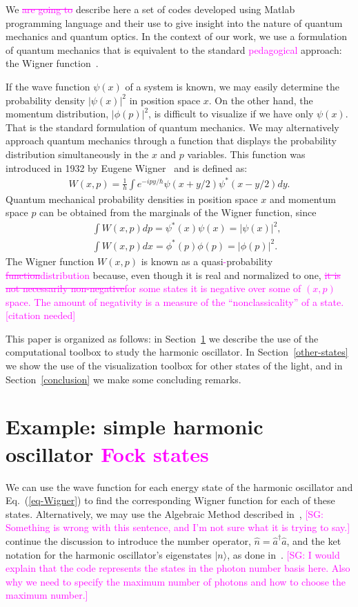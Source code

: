 \documentclass[twocolumn]{rbef}
\providecommand{\aucmnt}[1]{#1}
\providecommand{\editcolor}[2]{\textcolor{#1}{#2}}
\providecommand{\aucmnt}[1]{}
\providecommand{\editcolor}[2]{#2}
\newcommand{\SG}[1]{\editcolor{magenta}{#1}}
\newcommand{\SGs}[1]{\aucmnt{\editcolor{magenta}{\sout{#1}}}}
\newcommand{\SGc}[1]{\aucmnt{\editcolor{magenta}{[SG: #1]}}}
\begin{document}
We \SGs{are going to} describe here a set of codes developed using
Matlab programming language and their use to give insight into the
nature of quantum mechanics and quantum optics. In the context of our
work, we use a formulation of quantum mechanics that is equivalent to
the standard \SG{pedagogical} approach: the Wigner
function~\cite{Case2008}.

If the wave function $\psi(x)$ of a system is known, we may easily determine the probability density $|\psi(x)|^2$ in position space $x$. On the other hand, the momentum distribution, $|\phi(p)|^2$, is difficult to visualize if we have only $\psi(x)$. That is the standard formulation of quantum mechanics. We may alternatively approach quantum mechanics through a function that displays the probability distribution simultaneously in the $x$ and $p$ variables. This function was introduced in 1932 by Eugene Wigner~\cite{Wigner1932} and is defined as:
\begin{eqnarray}
W(x,p) = \frac{1}{h} \int e^{-i p y/\hbar} \psi(x+y/2) \psi^{\ast}(x-y/2) dy.
\label{eq-Wigner}
\end{eqnarray}
Quantum mechanical probability densities in position space $x$ and momentum space $p$ can be obtained from the marginals of the Wigner function, since
\begin{eqnarray}
&&\int W(x,p) dp = \psi^{\ast}(x) \psi(x) = |\psi(x)|^2, \nonumber \\
&&\int W(x,p) dx = \phi^{\ast}(p) \phi(p) = |\phi(p)|^2.
\end{eqnarray}
The Wigner function $W(x, p)$ is known as a quasi\SG{-}probability
\SGs{function}\SG{distribution} because, even though it is real and
normalized to one, \SGs{it is not necessarily non-negative}\SG{for
  some states it is negative over some of $(x,p)$ space. The amount of
  negativity is a measure of the ``nonclassicality'' of a
  state.[citation needed]}

This paper is organized as follows: in Section~\ref{harmonic-oscillator} we describe the use of the computational toolbox to study the harmonic oscillator. In Section~\ref{other-states} we show the use of the visualization toolbox for other states of the light, and in Section~\ref{conclusion} we make some concluding remarks.

\section{Example: simple harmonic oscillator \SG{Fock states}}
\label{harmonic-oscillator}
We can use the wave function for each energy state of the harmonic
oscillator and Eq.~(\ref{eq-Wigner}) to find the corresponding Wigner
function for each of these states. Alternatively, we may use the
Algebraic Method described in~\cite{Griffiths2004}, \SGc{Something is
  wrong with this sentence, and I'm not sure what it is trying to
  say.} continue the discussion to introduce the number operator,
$\hat{n} = \hat{a}^{\dagger}\hat{a}$, and the ket notation for the
harmonic oscillator's eigenstates $|n\rangle$, as done
in~\cite{Sakurai1993}. \SGc{I would explain that the code represents
  the states in the photon number basis here.  Also why we need to
  specify the maximum number of photons and how to choose the maximum
  number.}
\end{document}

